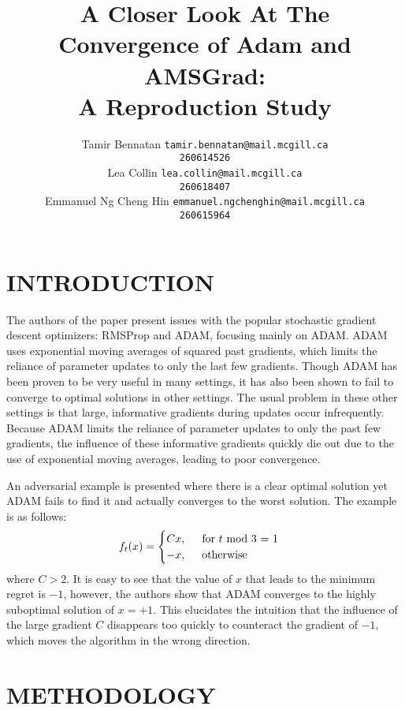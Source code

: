 \documentclass[letterpaper, 10 pt, conference]{ieeeconf}  %
\title{\LARGE \bf
A Closer Look At The Convergence of Adam and AMSGrad:\\A Reproduction Study
}
\author{ 
	\parbox{2 in}{\centering Tamir Bennatan
         {\tt\small tamir.bennatan@mail.mcgill.ca\\}
         {\tt\small 260614526}}
         \hspace*{ 0.3 in}
         \parbox{2 in}{\centering Lea Collin
         {\tt\small lea.collin@mail.mcgill.ca\\}
         {\tt\small 260618407}}
         \hspace*{0.3 in}
         \parbox{2 in}{\centering Emmanuel Ng Cheng Hin
         {\tt\small emmanuel.ngchenghin@mail.mcgill.ca\\}
         {\tt\small 260615964}}
}
\begin{document}
\maketitle
\thispagestyle{empty}
\pagestyle{empty}



\section{INTRODUCTION}

	The authors of the paper present issues with the popular stochastic gradient descent optimizers: RMSProp and ADAM, focusing mainly on ADAM. ADAM uses exponential moving averages of squared past gradients, which limits the reliance of parameter updates to only the last few gradients. Though ADAM has been proven to be very useful in many settings, it has also been shown to fail to converge to optimal solutions in other settings. The usual problem in these other settings is that large, informative gradients during updates occur infrequently. Because ADAM limits the reliance of parameter updates to only the past few gradients, the influence of these informative gradients quickly die out due to the use of exponential moving averages, leading to poor convergence. \par
	An adversarial example is presented where there is a clear optimal solution yet ADAM fails to find it and actually converges to the worst solution. The example is as follows:
\[
    f_{t}(x) = 
    \begin{cases}
     	Cx, \hspace{5mm} \text{for } t \text{ mod 3 = 1} \\
        -x, \hspace{5mm} \text{otherwise}
    \end{cases}
\]
where $C>2$. It is easy to see that the value of $x$ that leads to the minimum regret is $-1$, however, the authors show that ADAM converges to the highly suboptimal solution of $x = +1$. This elucidates the intuition that the influence of the large gradient $C$ disappears too quickly to counteract the gradient of $-1$, which moves the algorithm in the wrong direction. 

\section{METHODOLOGY}
\end{document}
